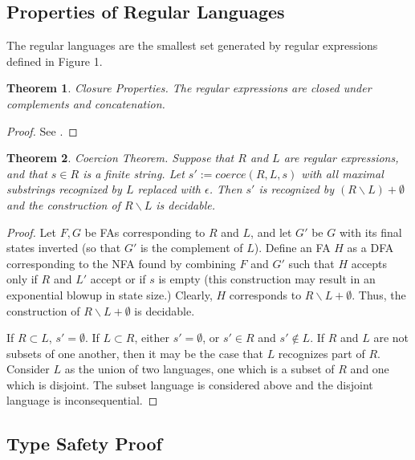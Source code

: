 \documentclass[10pt,preprint]{sigplanconf}
\newtheorem{thm}{Theorem}
\newtheorem{lem}[thm]{Lemma}
\theoremstyle{definition}
\newcommand{\str}{ {\tt string} }
\newcommand{\val}{ \ {\tt val} }
\newcommand{\strf}[1]{``#1"}
\newcommand{\lcs}{\lambda_{CS}}
\begin{document}
\subsection{Properties of Regular Languages}

The regular languages are the smallest set generated by regular expressions
defined in Figure 1.

\begin{thm}{Closure Properties.} \label{thm:closure}
The regular expressions are closed under complements and concatenation.
\end{thm}
\begin{proof}
See \cite{cinderella}.
\end{proof}

\begin{thm}{Coercion Theorem.} \label{thm:coerce}
Suppose that $R$ and $L$ are regular expressions, and that $s \in R$ is a finite string.  Let $s' := coerce(R,L,s)$ with all maximal substrings recognized by $L$ replaced with $\epsilon$.  Then $s'$ is recognized by $(R \backslash L) + \emptyset$ and the construction of $R \backslash L$ is decidable.
\end{thm}
\begin{proof}
Let $F,G$ be FAs corresponding to $R$ and $L$, and let $G'$ be $G$ with its final states inverted (so that $G'$ is the complement of $L$).  Define an FA $H$ as a DFA corresponding to the NFA found by combining $F$ and $G'$ such that $H$ accepts only if $R$ and $L'$ accept or if $s$ is empty (this construction may result in an exponential blowup in state size.)  Clearly, $H$ corresponds to $R \backslash L + \emptyset$.  Thus, the construction of $R \backslash L + \emptyset$ is decidable.

If $R \subset L$, $s' = \emptyset$.  If $L \subset R$, either $s' = \emptyset$, or $s' \in R$ and $s' \not \in L$. If $R$ and $L$ are not subsets of one another, then it may be the case that $L$ recognizes part of $R$.  Consider $L$ as the union of two languages, one which is a subset of $R$ and one which is disjoint.  The subset language is considered above and the disjoint language is inconsequential.
\end{proof}

\subsection{Type Safety Proof}

\end{document}
